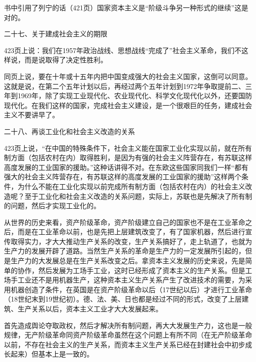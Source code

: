 书中引用了列宁的话（421页）国家资本主义是“阶级斗争另一种形式的继续”这是对的。

二十七、关于建成社会主义的期限

423页上说：我们在1957年政治战线、思想战线“完成了”社会主义革命，我们不这样说，而是说取得了决定性胜利。

同页上说，要在十年或十五年内把中国变成强大的社会主义国家，这倒可以同意。这就是说，在第二个五年计划以后，再经过两个五年计划到1972年争取提前二、三年到1969年，除了实现工业现代化、农业现代化、科学文化现代化以外，还要国防现代化。在我们这样的国家，完成社会主义建设，是一个很艰巨的任务，建成社会主义不要讲早了。

二十八、再谈工业化和社会主义改造的关系

423页上说，“在中国的特殊条件下，社会主义能在国家工业化实现以前，就在所有制方面（包括农村在内）取得胜利，是因为有强的社会主义阵营存在，有苏联这样高度发展的工业国家的援助。”这种话讲得不对。在东欧这些国家同我们一样“都有强大的社会主义阵营存在，有苏联这样的高度发展的工业国家的援助”这样两个条件，为什么不能在工业化实现以前完成所有制方面（包括农村在内）的社会主义改造呢？至于工业化和社会主义改造的关系问题，实际上，苏联也是先解决了所有制的问题，然后才实现工业化的。

从世界的历史来看，资产阶级革命，资产阶级建立自己的国家也不是在工业革命之后，而是在工业革命以前，也是先把上层建筑改变了，有了国家机器，然后进行宣传取得实力，才大大推动生产关系的改变，生产关系搞好了，走上轨道了，也就为生产力的发展开辟了道路。当然生产关系的革命是生产力的一定发展所引起的，但是生产力的大发展总是在生产关系改变之后。拿资本主义发展的历史来说，先是简单的协作，然后发展为工场手工业，这时已经形成了资本主义的生产关系。但是工场手工业还不是用机器生产，这种资本主义生产关系产生了改进技术的需要，为采用机器创造了条件，在英国是在资产阶级革命以后（17世纪以后）才进行工业革命（18世纪末到19世纪初）。德、法、美、日也都是经过不同的形式，改变了上层建筑、生产关系以后，资本主义工业才大大发展起来。

首先造成舆论夺取政权，然后才解决所有制问题，再大大发展生产力，这也是一般规律，无产阶级革命同资产阶级革命虽然在这个问题上有所不同（在无产阶级革命以前，不存在社会主义的生产关系，而资本主义生产关系已经在封建社会中初步成长起来）但基本上是一致的。


